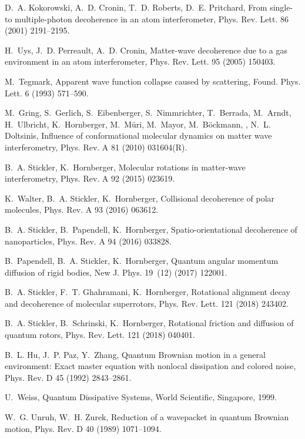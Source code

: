 \documentclass[3p,sort&compress]{elsarticle}
\begin{document}
\begin{thebibliography}{100}
D.~A. Kokorowski, A.~D. Cronin, T.~D. Roberts, D.~E. Pritchard, From single- to
  multiple-photon decoherence in an atom interferometer, Phys. Rev. Lett. 86
  (2001) 2191--2195.

H.~Uys, J.~D. Perreault, A.~D. Cronin, Matter-wave decoherence due to a gas
  environment in an atom interferometer, Phys. Rev. Lett. 95 (2005) 150403.

M.~Tegmark, Apparent wave function collapse caused by scattering, Found. Phys.
  Lett. 6 (1993) 571--590.

M.~Gring, S.~Gerlich, S.~Eibenberger, S.~Nimmrichter, T.~Berrada, M.~Arndt,
  H.~Ulbricht, K.~Hornberger, M.~M{\"u}ri, M.~Mayor, M.~B{\"o}ckmann, , N.~L.
  Doltsinis, Influence of conformational molecular dynamics on matter wave
  interferometry, Phys. Rev. A 81 (2010) 031604(R).

B.~A. Stickler, K.~Hornberger, Molecular rotations in matter-wave
  interferometry, Phys. Rev. A 92 (2015) 023619.

K.~Walter, B.~A. Stickler, K.~Hornberger, Collisional decoherence of polar
  molecules, Phys. Rev. A 93 (2016) 063612.

B.~A. Stickler, B.~Papendell, K.~Hornberger, Spatio-orientational decoherence
  of nanoparticles, Phys. Rev. A 94 (2016) 033828.

B.~Papendell, B.~A. Stickler, K.~Hornberger, Quantum angular momentum diffusion
  of rigid bodies, New J. Phys. 19~(12) (2017) 122001.

B.~A. Stickler, F.~T. Ghahramani, K.~Hornberger, Rotational alignment decay and
  decoherence of molecular superrotors, Phys. Rev. Lett. 121 (2018) 243402.

B.~A. Stickler, B.~Schrinski, K.~Hornberger, Rotational friction and diffusion
  of quantum rotors, Phys. Rev. Lett. 121 (2018) 040401.

B.~L. Hu, J.~P. Paz, Y.~Zhang, Quantum {B}rownian motion in a general
  environment: {E}xact master equation with nonlocal dissipation and colored
  noise, Phys. Rev. D 45 (1992) 2843--2861.

U.~Weiss, Quantum Dissipative Systems, World Scientific, Singapore, 1999.

W.~G. Unruh, W.~H. Zurek, Reduction of a wavepacket in quantum {B}rownian
  motion, Phys. Rev. D 40 (1989) 1071--1094.


\end{thebibliography}
\end{document}
